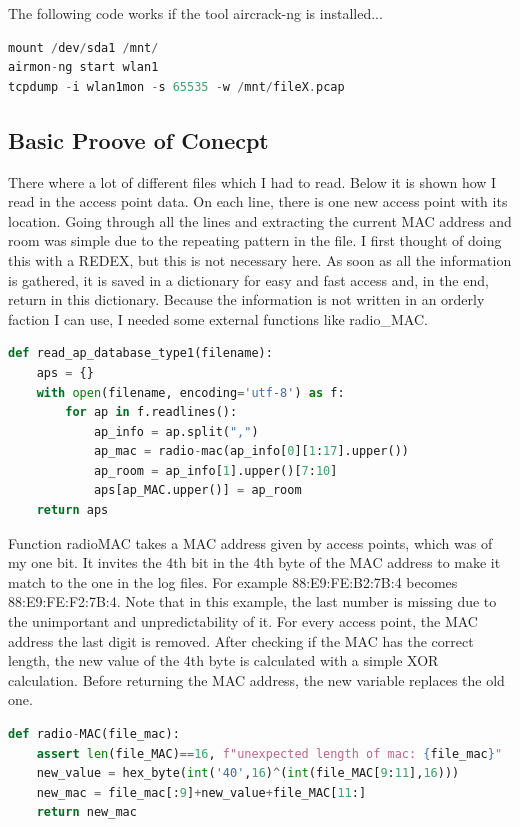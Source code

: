 \documentclass[11pt]{article}
\begin{document}
The following code works if the tool aircrack-ng is installed...

\begin{lstlisting}[language=PHP, caption="aircrack-ng example"]
mount /dev/sda1 /mnt/
airmon-ng start wlan1
tcpdump -i wlan1mon -s 65535 -w /mnt/fileX.pcap
\end{lstlisting}




\subsection{Basic Proove of Conecpt}
There where a lot of different files which I had to read. Below it is shown how I read in the access point data. On each line, there is one new access point with its location. Going through all the lines and extracting the current MAC address and room was simple due to the repeating pattern in the file. I first thought of doing this with a REDEX, but this is not necessary here. As soon as all the information is gathered, it is saved in a dictionary for easy and fast access and, in the end, return in this dictionary.
Because the information is not written in an orderly faction I can use, I needed some external functions like radio\_MAC.
\begin{lstlisting}[language=Python, caption="read\_ap\_database\_type1",style=python]
def read_ap_database_type1(filename):
    aps = {}
    with open(filename, encoding='utf-8') as f:
        for ap in f.readlines():
            ap_info = ap.split(",")
            ap_mac = radio-mac(ap_info[0][1:17].upper())
            ap_room = ap_info[1].upper()[7:10]
            aps[ap_MAC.upper()] = ap_room
    return aps
\end{lstlisting}

Function radio\-MAC takes a MAC address given by access points, which was of my one bit. It invites the 4th bit in the 4th byte of the MAC address to make it match to the one in the log files.  For example  88:E9:FE:B2:7B:4 becomes  88:E9:FE:F2:7B:4. Note that in this example, the last number is missing due to the unimportant and unpredictability of it. For every access point, the MAC address the last digit is removed. 
After checking if the MAC has the correct length, the new value of the 4th byte is calculated with a simple XOR calculation. Before returning the MAC address, the new variable replaces the old one.
\begin{lstlisting}[language=python,caption="radio-mac",style=python]
def radio-MAC(file_mac):
    assert len(file_MAC)==16, f"unexpected length of mac: {file_mac}"
    new_value = hex_byte(int('40',16)^(int(file_MAC[9:11],16))) 
    new_mac = file_mac[:9]+new_value+file_MAC[11:]
    return new_mac
\end{lstlisting}
\end{document}
